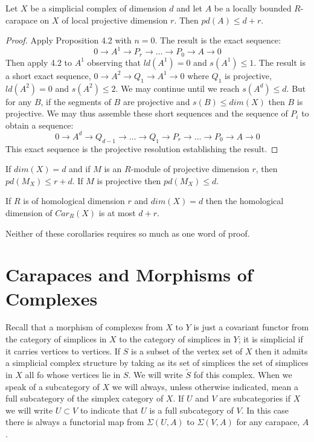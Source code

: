 \begin{theorem}\label{art6-thm-4.4}
Let $X$ be a simplicial complex of dimension $d$ and let $A$ be a locally bounded $R$-carapace on $X$ of local projective dimension $r$. Then $pd(A)\leq d+r$.
\end{theorem}

\begin{proof}
 Apply Proposition 4.2 with $n=0$. The result is the exact sequence:
 $$
 0 \rightarrow A^{1} \rightarrow P_{r}\rightarrow \ldots \rightarrow P_{0}\rightarrow A \rightarrow 0
 $$
 Then apply 4.2 to $A^{1}$ observing that $ld(A^{1})= 0$ and $s(A^{1})\leq 1$. The result is a short exact sequence, $0 \rightarrow A^{2} \rightarrow Q_{1} \rightarrow A^{1} \rightarrow 0$ where $Q_{1}$ is projective, $ld(A^{2})=0$ and $s(A^{2})\leq 2$. We may continue until we reach $s(A^{d})\leq d$. But for any $B$, if the segments of $B$ are projective and $s(B)\leq dim(X)$ then $B$ is projective. We may thus assemble these short sequences and the sequence of $P_{i}$ to obtain a sequence:
 $$
 0\rightarrow A^{d} \rightarrow Q_{d-1} \rightarrow \ldots \rightarrow Q_{1} \rightarrow P_{r} \rightarrow \ldots \rightarrow
 P_{0}\rightarrow A \rightarrow 0
 $$
 This exact sequence is the projective resolution establishing the result.
 \end{proof}

\begin{coro}\label{art6-coro-4.5}
If $dim(X) =d$ and if $M$ is an $R$-module of projective dimension $r$, then $pd(M_{X})\leq r+d$. If $M$ is projective then $pd(M_{X}) \leq d$. 
\end{coro}

\begin{coro}\label{art6-coro-4.6}
If $R$ is of homological dimension $r$ and $dim(X)= d$ then the homological dimension of $C ar_{R}(X)$ is at most $d+r$.
\end{coro}

Neither of these corollaries requires so much as one word of proof.

\section{Carapaces and Morphisms of Complexes}\label{art6-sec-5}
Recall that a morphism of complexes from $X$ to $Y$ is just a covariant functor from the category of simplices in $X$ to the category of simplices in $Y$; it is simplicial if it carries vertices to vertices. If $S$ is a subset of the vertex set of $X$ then it admits a simplicial complex structure by taking as its set of simplices the set of simplices in $X$ all fo whose vertices lie in $S$. We will write $\tilde{S}$ fof this complex. When we speak of a subcategory of $X$ we will always, unless otherwise indicated, mean a full subcategory of the simplex category of $X$. If $U$ and $V$ are subcategories if $X$  we will write $U \subset V$ to indicate that $U$ is a full subcategory of $V$. In this case there is always a functorial map from $\Sigma(U, A)$ to $\Sigma(V, A)$ for any carapace, $A$.

